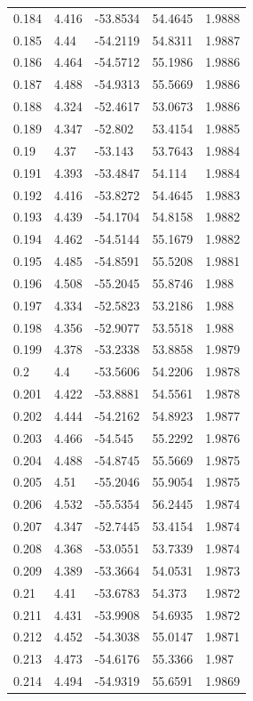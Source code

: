 \begin{tabular}{lllll}
0.184 & 4.416 & -53.8534 & 54.4645 & 1.9888 \\
0.185 & 4.44 & -54.2119 & 54.8311 & 1.9887 \\
0.186 & 4.464 & -54.5712 & 55.1986 & 1.9886 \\
0.187 & 4.488 & -54.9313 & 55.5669 & 1.9886 \\
0.188 & 4.324 & -52.4617 & 53.0673 & 1.9886 \\
0.189 & 4.347 & -52.802 & 53.4154 & 1.9885 \\
0.19 & 4.37 & -53.143 & 53.7643 & 1.9884 \\
0.191 & 4.393 & -53.4847 & 54.114 & 1.9884 \\
0.192 & 4.416 & -53.8272 & 54.4645 & 1.9883 \\
0.193 & 4.439 & -54.1704 & 54.8158 & 1.9882 \\
0.194 & 4.462 & -54.5144 & 55.1679 & 1.9882 \\
0.195 & 4.485 & -54.8591 & 55.5208 & 1.9881 \\
0.196 & 4.508 & -55.2045 & 55.8746 & 1.988 \\
0.197 & 4.334 & -52.5823 & 53.2186 & 1.988 \\
0.198 & 4.356 & -52.9077 & 53.5518 & 1.988 \\
0.199 & 4.378 & -53.2338 & 53.8858 & 1.9879 \\
0.2 & 4.4 & -53.5606 & 54.2206 & 1.9878 \\
0.201 & 4.422 & -53.8881 & 54.5561 & 1.9878 \\
0.202 & 4.444 & -54.2162 & 54.8923 & 1.9877 \\
0.203 & 4.466 & -54.545 & 55.2292 & 1.9876 \\
0.204 & 4.488 & -54.8745 & 55.5669 & 1.9875 \\
0.205 & 4.51 & -55.2046 & 55.9054 & 1.9875 \\
0.206 & 4.532 & -55.5354 & 56.2445 & 1.9874 \\
0.207 & 4.347 & -52.7445 & 53.4154 & 1.9874 \\
0.208 & 4.368 & -53.0551 & 53.7339 & 1.9874 \\
0.209 & 4.389 & -53.3664 & 54.0531 & 1.9873 \\
0.21 & 4.41 & -53.6783 & 54.373 & 1.9872 \\
0.211 & 4.431 & -53.9908 & 54.6935 & 1.9872 \\
0.212 & 4.452 & -54.3038 & 55.0147 & 1.9871 \\
0.213 & 4.473 & -54.6176 & 55.3366 & 1.987 \\
0.214 & 4.494 & -54.9319 & 55.6591 & 1.9869 \\

\end{tabular}

